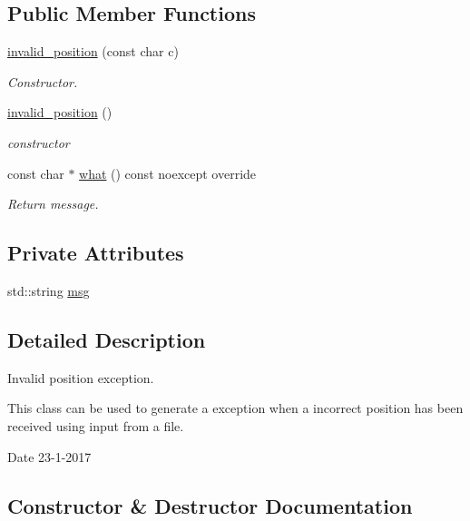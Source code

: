 \subsection*{Public Member Functions}
\begin{DoxyCompactItemize}
\item 
\hyperlink{classinvalid__position_a3d39f52e55d28fe6e9b4af02b7c6f278}{invalid\+\_\+position} (const char c)
\begin{DoxyCompactList}\small\item\em Constructor. \end{DoxyCompactList}\item 
\hyperlink{classinvalid__position_aabeae0fae84fada6af68ff83a68c6542}{invalid\+\_\+position} ()
\begin{DoxyCompactList}\small\item\em constructor \end{DoxyCompactList}\item 
const char $\ast$ \hyperlink{classinvalid__position_a7de16130368fed8546deef6713025cfa}{what} () const noexcept override
\begin{DoxyCompactList}\small\item\em Return message. \end{DoxyCompactList}\end{DoxyCompactItemize}
\subsection*{Private Attributes}
\begin{DoxyCompactItemize}
\item 
std\+::string \hyperlink{classinvalid__position_a53d057adf627ad9d7942a3233bca9028}{msg}
\end{DoxyCompactItemize}


\subsection{Detailed Description}
Invalid position exception. 

This class can be used to generate a exception when a incorrect position has been received using input from a file.

\begin{DoxyDate}{Date}
23-\/1-\/2017 
\end{DoxyDate}


\subsection{Constructor \& Destructor Documentation}
\mbox{\label{classinvalid__position_a3d39f52e55d28fe6e9b4af02b7c6f278}} 
